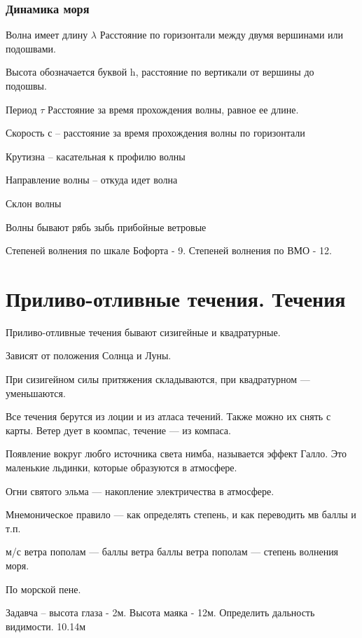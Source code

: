\documentclass{article}        %
\begin{document}
\subsubsection{Динамика моря}
\begin{definition}
Волна имеет длину $\lambda $
Расстояние по горизонтали между двумя вершинами или подошвами. 

Высота обозначается буквой h, расстояние по вертикали от вершины до подошвы.

Период $\tau$
Расстояние за время прохождения волны, равное ее длине.

Скорость с -- расстояние за время прохождения волны по горизонтали

Крутизна -- касательная к профилю волны

Направление волны -- откуда идет волна
\end{definition}

Склон волны

Волны бывают
	рябь
	зыбь
	прибойные
	ветровые

Степеней волнения по шкале Бофорта - 9. 
Степеней волнения по ВМО - 12.



\section{Приливо-отливные течения. Течения}
Приливо-отливные течения бывают сизигейные и квадратурные.

Зависят от положения Солнца и Луны.

При сизигейном силы притяжения складываются, при квадратурном --- уменьшаются.

Все течения берутся из лоции и из атласа течений. Также можно их снять с карты. Ветер дует в коомпас, течение --- из компаса.

Появление вокруг любго источника света нимба, называется эффект Галло. Это маленькие льдинки, которые образуются в атмосфере.

Огни святого эльма --- накопление электричества в атмосфере. 

Мнемоническое правило --- как определять степень, и как переводить м\с в баллы и т.п.

м/с ветра пополам --- баллы ветра
баллы ветра пополам --- степень волнения моря.

По морской пене. 

Задавча -- высота глаза - 2м. Высота маяка - 12м. Определить дальность видимости.
10.14м
\end{document}

